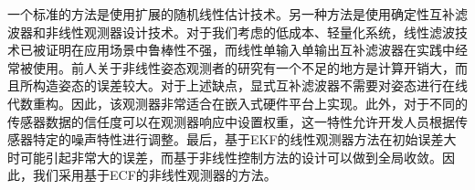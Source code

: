 \documentclass[
  type=master
]{gdutthesis}
\begin{document}
一个标准的方法是使用扩展的随机线性估计技术\cite{lefferts1982kalman,barshan1995inertial}。另一种方法是使用确定性互补滤波器和非线性观测器设计技术\cite{zimmermann1992high,baerveldt1997low,vik2001nonlinear}。对于我们考虑的低成本、轻量化系统，线性滤波技术已被证明在应用场景中鲁棒性不强\cite{roberts2003low}，而线性单输入单输出互补滤波器在实践中经常被使用\cite{saripalli2003tale,corke2004inertial}。前人关于非线性姿态观测者的研究有一个不足的地方是计算开销大，而且所构造姿态的误差较大。对于上述缺点，显式互补滤波器不需要对姿态进行在线代数重构。因此，该观测器非常适合在嵌入式硬件平台上实现。此外，对于不同的传感器数据的信任度可以在观测器响应中设置权重，这一特性允许开发人员根据传感器特定的噪声特性进行调整。最后，基于EKF的线性观测器方法在初始误差大时可能引起非常大的误差，而基于非线性控制方法的设计可以做到全局收敛。因此，我们采用基于ECF的非线性观测器的方法\cite{mahony2008nonlinear}。
\end{document}
